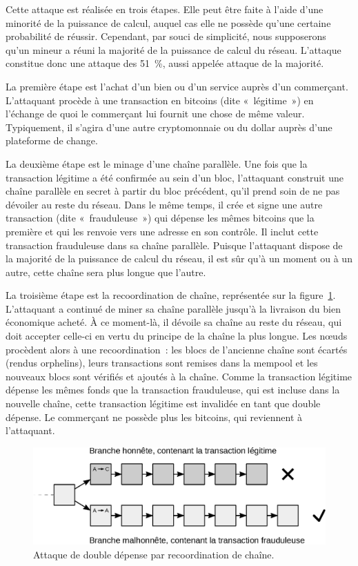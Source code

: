 Cette attaque est réalisée en trois étapes. Elle peut être faite à l'aide d'une minorité de la puissance de calcul, auquel cas elle ne possède qu'une certaine probabilité de réussir. Cependant, par souci de simplicité, nous supposerons qu'un mineur a réuni la majorité de la puissance de calcul du réseau. L'attaque constitue donc une attaque des 51~\%, aussi appelée attaque de la majorité.

La première étape est l'achat d'un bien ou d'un service auprès d'un commerçant. L'attaquant procède à une transaction en bitcoins (dite «~légitime~») en l'échange de quoi le commerçant lui fournit une chose de même valeur. Typiquement, il s'agira d'une autre cryptomonnaie ou du dollar auprès d'une plateforme de change.

La deuxième étape est le minage d'une chaîne parallèle. Une fois que la transaction légitime a été confirmée au sein d'un bloc, l'attaquant construit une chaîne parallèle en secret à partir du bloc précédent, qu'il prend soin de ne pas dévoiler au reste du réseau. Dans le même temps, il crée et signe une autre transaction (dite «~frauduleuse~») qui dépense les mêmes bitcoins que la première et qui les renvoie vers une adresse en son contrôle. Il inclut cette transaction frauduleuse dans sa chaîne parallèle. Puisque l'attaquant dispose de la majorité de la puissance de calcul du réseau, il est sûr qu'à un moment ou à un autre, cette chaîne sera plus longue que l'autre.

La troisième étape est la recoordination de chaîne, représentée sur la figure~\ref{fig:doublespending-attack}. L'attaquant a continué de miner sa chaîne parallèle jusqu'à la livraison du bien économique acheté. À ce moment-là, il dévoile sa chaîne au reste du réseau, qui doit accepter celle-ci en vertu du principe de la chaîne la plus longue. Les nœuds procèdent alors à une recoordination~: les blocs de l'ancienne chaîne sont écartés (rendus orphelins), leurs transactions sont remises dans la mempool et les nouveaux blocs sont vérifiés et ajoutés à la chaîne. Comme la transaction légitime dépense les mêmes fonds que la transaction frauduleuse, qui est incluse dans la nouvelle chaîne, cette transaction légitime est invalidée en tant que double dépense. Le commerçant ne possède plus les bitcoins, qui reviennent à l'attaquant.

\begin{figure}[h]
  \centering
  \includegraphics[scale=0.7]{img/mining-attack-doublespending.eps}
  \caption{Attaque de double dépense par recoordination de chaîne.}
  \label{fig:doublespending-attack}
\end{figure}

